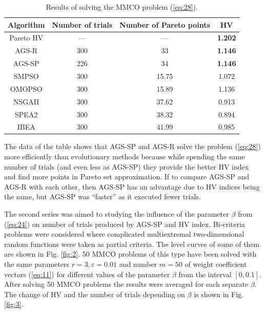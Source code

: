 \documentclass[runningheads]{llncs}
\begin{document}
\begin{table}[ht]
\caption{Results of solving the MMCO problem (\ref{eq:28}).}
\label{tab:01}
\center
\begin{tabular}{|c|c|c|c|}
\hline
\textbf{Algorithm} & \textbf{Number of trials} & \textbf{Number of Pareto points} & \textbf{HV}    \\ \hline
Pareto HV          & ---                       & ---                              & \textbf{1.202} \\
AGS-R              & 300                       & 33                               & \textbf{1.146} \\
AGS-SP             & 226                       & 34                               & \textbf{1.146} \\
SMPSO              & 300                       & 15.75                            & 1.072          \\
OMOPSO             & 300                       & 15.89                            & 1.136          \\
NSGAII             & 300                       & 37.62                            & 0.913          \\
SPEA2              & 300                       & 38.32                            & 0.894          \\
IBEA               & 300                       & 41.99                            & 0.985          \\ \hline
\end{tabular}
\end{table}

The data of the table shows that AGS-SP and AGS-R solve the problem (\ref{eq:28}) more efficiently than evolutionary methods because while spending the same number of trials (and even less as AGS-SP) they provide the  better HV index and find more points in Pareto set approximation. If to compare AGS-SP and AGS-R with each other, then AGS-SP has an advantage due to HV indices being the same, but AGS-SP was ``faster'' as it executed fewer trials.

The second series was aimed to studying the influence of the parameter $\beta$ from (\ref{eq:24}) on number of trials produced by AGS-SP and HV index. Bi-criteria problems were considered where complicated multiextremal two-dimensional random functions \cite{Grishagin2015_2} were taken as partial criteria. The level curves of some of them are shown in Fig.  \ref{fig:2}. 50 MMCO problems of this type have been solved with the same parameters $r=3, \varepsilon=0.01$ and number $m=50$ of weight coefficient vectors (\ref{eq:11}) for different values of the parameter $\beta$ from the interval $[0,0.1]$. After solving 50 MMCO problems the results were averaged for each separate $\beta$. The change of HV and the number of trials depending on $\beta$ is shown in Fig. \ref{fig:3}.
\end{document}
